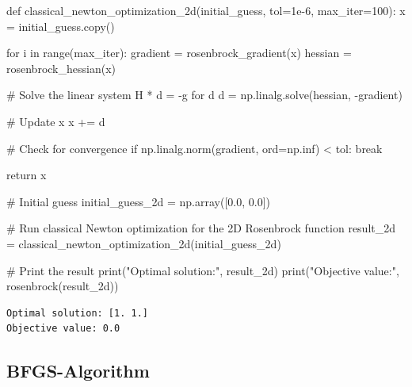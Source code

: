 \documentclass[
  letterpaper,
  DIV=11,
  numbers=noendperiod]{scrreprt}
\newenvironment{Shaded}{\begin{snugshade}}{\end{snugshade}}
\newcommand{\BuiltInTok}[1]{\textcolor[rgb]{0.00,0.23,0.31}{#1}}
\newcommand{\CommentTok}[1]{\textcolor[rgb]{0.37,0.37,0.37}{#1}}
\newcommand{\ControlFlowTok}[1]{\textcolor[rgb]{0.00,0.23,0.31}{#1}}
\newcommand{\DecValTok}[1]{\textcolor[rgb]{0.68,0.00,0.00}{#1}}
\newcommand{\FloatTok}[1]{\textcolor[rgb]{0.68,0.00,0.00}{#1}}
\newcommand{\KeywordTok}[1]{\textcolor[rgb]{0.00,0.23,0.31}{#1}}
\newcommand{\NormalTok}[1]{\textcolor[rgb]{0.00,0.23,0.31}{#1}}
\newcommand{\OperatorTok}[1]{\textcolor[rgb]{0.37,0.37,0.37}{#1}}
\newcommand{\StringTok}[1]{\textcolor[rgb]{0.13,0.47,0.30}{#1}}
\begin{document}
\begin{tcolorbox}
\begin{Shaded}
\begin{Highlighting}[]
\KeywordTok{def}\NormalTok{ classical\_newton\_optimization\_2d(initial\_guess, tol}\OperatorTok{=}\FloatTok{1e{-}6}\NormalTok{, max\_iter}\OperatorTok{=}\DecValTok{100}\NormalTok{):}
\NormalTok{    x }\OperatorTok{=}\NormalTok{ initial\_guess.copy()}

    \ControlFlowTok{for}\NormalTok{ i }\KeywordTok{in} \BuiltInTok{range}\NormalTok{(max\_iter):}
\NormalTok{        gradient }\OperatorTok{=}\NormalTok{ rosenbrock\_gradient(x)}
\NormalTok{        hessian }\OperatorTok{=}\NormalTok{ rosenbrock\_hessian(x)}

        \CommentTok{\# Solve the linear system H * d = {-}g for d}
\NormalTok{        d }\OperatorTok{=}\NormalTok{ np.linalg.solve(hessian, }\OperatorTok{{-}}\NormalTok{gradient)}

        \CommentTok{\# Update x}
\NormalTok{        x }\OperatorTok{+=}\NormalTok{ d}

        \CommentTok{\# Check for convergence}
        \ControlFlowTok{if}\NormalTok{ np.linalg.norm(gradient, }\BuiltInTok{ord}\OperatorTok{=}\NormalTok{np.inf) }\OperatorTok{\textless{}}\NormalTok{ tol:}
            \ControlFlowTok{break}

    \ControlFlowTok{return}\NormalTok{ x}

\CommentTok{\# Initial guess}
\NormalTok{initial\_guess\_2d }\OperatorTok{=}\NormalTok{ np.array([}\FloatTok{0.0}\NormalTok{, }\FloatTok{0.0}\NormalTok{])}

\CommentTok{\# Run classical Newton optimization for the 2D Rosenbrock function}
\NormalTok{result\_2d }\OperatorTok{=}\NormalTok{ classical\_newton\_optimization\_2d(initial\_guess\_2d)}

\CommentTok{\# Print the result}
\BuiltInTok{print}\NormalTok{(}\StringTok{"Optimal solution:"}\NormalTok{, result\_2d)}
\BuiltInTok{print}\NormalTok{(}\StringTok{"Objective value:"}\NormalTok{, rosenbrock(result\_2d))}
\end{Highlighting}
\end{Shaded}

\begin{verbatim}
Optimal solution: [1. 1.]
Objective value: 0.0
\end{verbatim}

\end{tcolorbox}

\hypertarget{bfgs-algorithm}{%
\subsection{BFGS-Algorithm}\label{bfgs-algorithm}}
\end{document}

